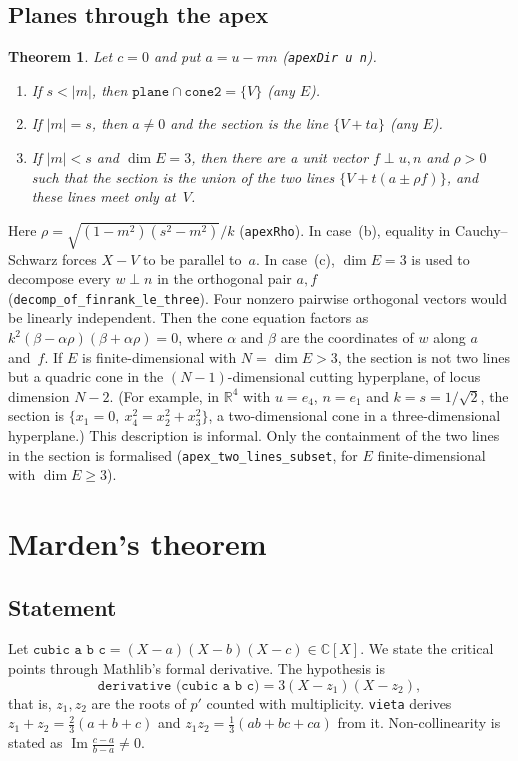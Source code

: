 \documentclass[11pt]{article}
\newtheorem{theorem}{Theorem}
\theoremstyle{remark}
\newcommand{\lean}[1]{\texttt{#1}}
\newcommand{\R}{\mathbb{R}}
\newcommand{\C}{\mathbb{C}}
\begin{document}
\subsection{Planes through the apex}

\begin{theorem}\label{thm:apex}
Let $c=0$ and put $a=u-mn$ (\lean{apexDir u n}).
\begin{enumerate}
\item[(a)] If $s<|m|$, then $\lean{plane}\cap\lean{cone2}=\{V\}$ (any $E$).
\item[(b)] If $|m|=s$, then $a\ne0$ and the section is the line $\{V+ta\}$ (any $E$).
\item[(c)] If $|m|<s$ and $\dim E=3$, then there are a unit vector $f\perp u,n$ and $\rho>0$ such that the section is
the union of the two lines $\{V+t(a\pm\rho f)\}$, and these lines meet only at~$V$.
\end{enumerate}
\end{theorem}

Here $\rho=\sqrt{(1-m^2)(s^2-m^2)}/k$ (\lean{apexRho}). In case~(b), equality in Cauchy--Schwarz
forces $X-V$ to be parallel to~$a$. In case~(c), $\dim E=3$ is used to decompose every
$w\perp n$ in the orthogonal pair $a,f$ (\lean{decomp\_of\_finrank\_le\_three}). Four nonzero
pairwise orthogonal vectors would be linearly independent. Then the cone equation factors as
$k^2(\beta-\alpha\rho)(\beta+\alpha\rho)=0$, where $\alpha$ and $\beta$ are the coordinates of $w$
along $a$ and~$f$. If $E$ is finite-dimensional with $N=\dim E>3$, the section is not two lines but
a quadric cone in the $(N-1)$-dimensional cutting hyperplane, of locus dimension $N-2$. (For
example, in $\R^4$ with $u=e_4$, $n=e_1$ and $k=s=1/\sqrt2$, the section is
$\{x_1=0,\ x_4^2=x_2^2+x_3^2\}$, a two-dimensional cone in a three-dimensional hyperplane.) This
description is informal. Only the containment of the two lines in the section is formalised
(\lean{apex\_two\_lines\_subset}, for $E$ finite-dimensional with $\dim E\ge3$).

\section{Marden's theorem}\label{sec:marden}

\subsection{Statement}\label{sec:mardenstmt}

Let $\lean{cubic a b c}=(X-a)(X-b)(X-c)\in\C[X]$. We state the critical points through Mathlib's
formal derivative. The hypothesis is
\[
\lean{derivative (cubic a b c)} = 3(X-z_1)(X-z_2),
\]
that is, $z_1,z_2$ are the roots of $p'$ counted with multiplicity. \lean{vieta} derives
$z_1+z_2=\tfrac23(a+b+c)$ and $z_1z_2=\tfrac13(ab+bc+ca)$ from it. Non-collinearity is stated as
$\operatorname{Im}\frac{c-a}{b-a}\ne0$.
\end{document}
